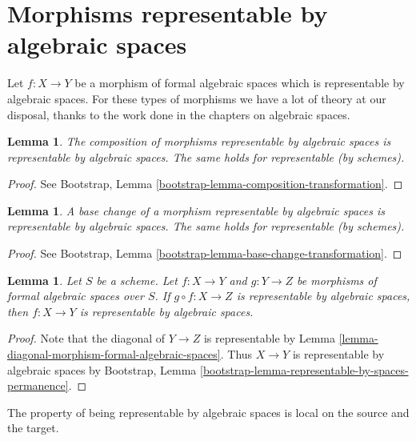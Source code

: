 \documentclass{stacks-project}
\theoremstyle{plain}
\newtheorem{lemma}[subsection]{Lemma}
\theoremstyle{definition}
\theoremstyle{remark}
\numberwithin{equation}{subsection}
\begin{document}
\section{Morphisms representable by algebraic spaces}
\label{section-representable}

\noindent
Let $f : X \to Y$ be a morphism of formal algebraic spaces which
is representable by algebraic spaces. For these types of morphisms
we have a lot of theory at our disposal, thanks to the work done
in the chapters on algebraic spaces.

\begin{lemma}
\label{lemma-composition-representable}
The composition of morphisms representable by algebraic spaces is
representable by algebraic spaces. The same holds for representable
(by schemes).
\end{lemma}

\begin{proof}
See Bootstrap, Lemma \ref{bootstrap-lemma-composition-transformation}.
\end{proof}

\begin{lemma}
\label{lemma-base-change-representable}
A base change of a morphism representable by algebraic spaces is
representable by algebraic spaces. The same holds for representable
(by schemes).
\end{lemma}

\begin{proof}
See Bootstrap, Lemma \ref{bootstrap-lemma-base-change-transformation}.
\end{proof}

\begin{lemma}
\label{lemma-permanence-representable}
Let $S$ be a scheme. Let $f : X \to Y$ and $g : Y \to Z$ be morphisms of
formal algebraic spaces over $S$. If $g \circ f : X \to Z$ is representable
by algebraic spaces, then $f : X \to Y$ is representable by algebraic spaces.
\end{lemma}

\begin{proof}
Note that the diagonal of $Y \to Z$ is representable by
Lemma \ref{lemma-diagonal-morphism-formal-algebraic-spaces}.
Thus $X \to Y$ is representable by algebraic spaces by
Bootstrap, Lemma \ref{bootstrap-lemma-representable-by-spaces-permanence}.
\end{proof}

\noindent
The property of being representable by algebraic spaces is local on the
source and the target.
\end{document}
